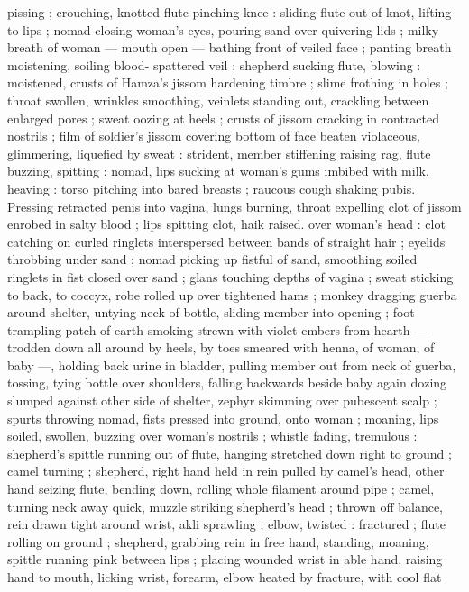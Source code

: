 pissing ; crouching, knotted flute pinching knee : sliding flute out of
knot, lifting to lips ; nomad closing woman's eyes, pouring sand over
quivering lids ; milky breath of woman --- mouth open --- bathing
front of veiled face ; panting breath moistening, soiling blood-
spattered veil ; shepherd sucking flute, blowing : moistened, crusts
of Hamza's jissom hardening timbre ; slime frothing in holes ; throat
swollen, wrinkles smoothing, veinlets standing out, crackling
between enlarged pores ; sweat oozing at heels ; crusts of jissom
cracking in contracted nostrils ; film of soldier's jissom covering
bottom of face beaten violaceous, glimmering, liquefied by sweat :
strident, member stiffening raising rag, flute buzzing, spitting :
nomad, lips sucking at woman's gums imbibed with milk, heaving :
torso pitching into bared breasts ; raucous cough shaking pubis.
Pressing retracted penis into vagina, lungs burning, throat expelling
clot of jissom enrobed in salty blood ; lips spitting clot, haik raised.
over woman's head : clot catching on curled ringlets interspersed
between bands of straight hair ; eyelids throbbing under sand ;
nomad picking up fistful of sand, smoothing soiled ringlets in fist
closed over sand ; glans touching depths of vagina ; sweat sticking
to back, to coccyx, robe rolled up over tightened hams ; monkey
dragging guerba around shelter, untying neck of bottle, sliding
member into opening ; foot trampling patch of earth smoking strewn
with violet embers from hearth --- trodden down all around by heels,
by toes smeared with henna, of woman, of baby ---, holding back
urine in bladder, pulling member out from neck of guerba, tossing,
tying bottle over shoulders, falling backwards beside baby again
dozing slumped against other side of shelter, zephyr skimming over
pubescent scalp ; spurts throwing nomad, fists pressed into ground,
onto woman ; moaning, lips soiled, swollen, buzzing over woman's
nostrils ; whistle fading, tremulous : shepherd's spittle running out
of flute, hanging stretched down right to ground ; camel turning ;
shepherd, right hand held in rein pulled by camel's head, other hand
seizing flute, bending down, rolling whole filament around pipe ;
camel, turning neck away quick, muzzle striking shepherd's head ;
thrown off balance, rein drawn tight around wrist, akli sprawling ;
elbow, twisted : fractured ; flute rolling on ground ; shepherd,
grabbing rein in free hand, standing, moaning, spittle running pink
between lips ; placing wounded wrist in able hand, raising hand to
mouth, licking wrist, forearm, elbow heated by fracture, with cool flat
